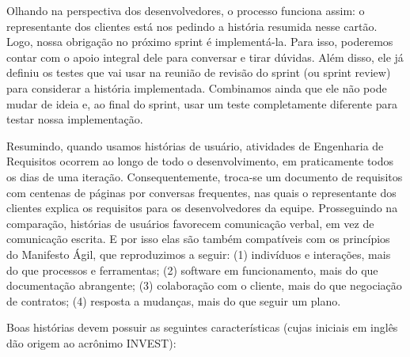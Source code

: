 \documentclass[
  11pt,
  twoside]{book}
\begin{document}
Olhando na perspectiva dos desenvolvedores, o processo funciona assim: o
representante dos clientes está nos pedindo a história resumida nesse
cartão. Logo, nossa obrigação no próximo sprint é implementá-la. Para
isso, poderemos contar com o apoio integral dele para conversar e tirar
dúvidas. Além disso, ele já definiu os testes que vai usar na reunião de
revisão do sprint (ou sprint review) para considerar a história
implementada. Combinamos ainda que ele não pode mudar de ideia e, ao
final do sprint, usar um teste completamente diferente para testar nossa
implementação.

Resumindo, quando usamos histórias de usuário, atividades de Engenharia
de Requisitos ocorrem ao longo de todo o desenvolvimento, em
praticamente todos os dias de uma iteração. Consequentemente, troca-se
um documento de requisitos com centenas de páginas por conversas
frequentes, nas quais o representante dos clientes explica os requisitos
para os desenvolvedores da equipe. Prosseguindo na comparação, histórias
de usuários favorecem comunicação verbal, em vez de comunicação escrita.
E por isso elas são também compatíveis com os princípios do Manifesto
Ágil, que reproduzimos a seguir: (1) indivíduos e interações, mais do
que processos e ferramentas; (2) software em funcionamento, mais do que
documentação abrangente; (3) colaboração com o cliente, mais do que
negociação de contratos; (4) resposta a mudanças, mais do que seguir um
plano.

 Boas histórias devem possuir
as seguintes características (cujas iniciais em inglês dão origem ao
acrônimo INVEST):
\end{document}
